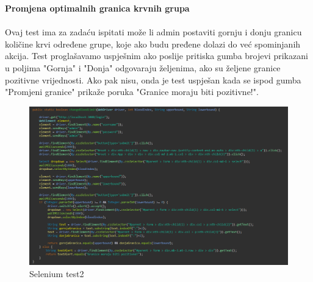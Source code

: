 \textbf{Promjena optimalnih granica krvnih grupa}	
\\\\
Ovaj test ima za zadaću ispitati može li admin postaviti gornju i donju granicu količine krvi određene grupe, koje ako budu pređene dolazi do već spominjanih akcija. Test proglašavamo uspješnim ako poslije pritiska gumba brojevi prikazani u poljima "Gornja" i "Donja" odgovaraju željenima, ako su željene granice pozitivne vrijednosti. Ako pak nisu, onda je test uspješan kada se ispod gumba "Promjeni granice" prikaže poruka "Granice moraju biti pozitivne!".
\eject
\begin{figure}[H]
	\centering
	\includegraphics[width=\textwidth, scale=0.5]{slike/selenium2}
	\caption{Selenium test2}
\end{figure}

